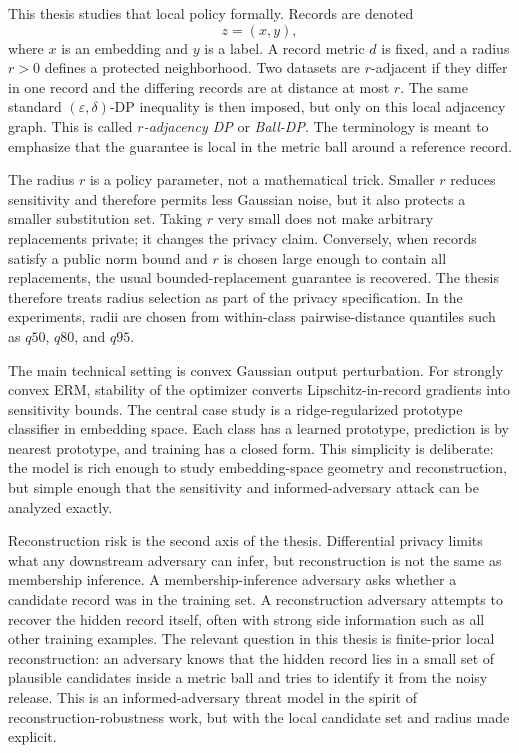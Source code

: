 \documentclass[11pt,a4paper]{report}
\theoremstyle{plain}
\theoremstyle{definition}
\theoremstyle{remark}
\begin{document}
This thesis studies that local policy formally.  Records are denoted
\[
 z=(x,y),
\]
where $x$ is an embedding and $y$ is a label.  A record metric $d$ is fixed, and a radius $r>0$ defines a protected neighborhood.  Two datasets are $r$-adjacent if they differ in one record and the differing records are at distance at most $r$.  The same standard $(\varepsilon,\delta)$-DP inequality is then imposed, but only on this local adjacency graph.  This is called \emph{$r$-adjacency DP} or \emph{Ball-DP}.  The terminology is meant to emphasize that the guarantee is local in the metric ball around a reference record.

The radius $r$ is a policy parameter, not a mathematical trick.  Smaller $r$ reduces sensitivity and therefore permits less Gaussian noise, but it also protects a smaller substitution set.  Taking $r$ very small does not make arbitrary replacements private; it changes the privacy claim.  Conversely, when records satisfy a public norm bound and $r$ is chosen large enough to contain all replacements, the usual bounded-replacement guarantee is recovered.  The thesis therefore treats radius selection as part of the privacy specification.  In the experiments, radii are chosen from within-class pairwise-distance quantiles such as $q50$, $q80$, and $q95$.

The main technical setting is convex Gaussian output perturbation.  For strongly convex ERM, stability of the optimizer converts Lipschitz-in-record gradients into sensitivity bounds.  The central case study is a ridge-regularized prototype classifier in embedding space.  Each class has a learned prototype, prediction is by nearest prototype, and training has a closed form.  This simplicity is deliberate: the model is rich enough to study embedding-space geometry and reconstruction, but simple enough that the sensitivity and informed-adversary attack can be analyzed exactly.

Reconstruction risk is the second axis of the thesis.  Differential privacy limits what any downstream adversary can infer, but reconstruction is not the same as membership inference.  A membership-inference adversary asks whether a candidate record was in the training set.  A reconstruction adversary attempts to recover the hidden record itself, often with strong side information such as all other training examples.  The relevant question in this thesis is finite-prior local reconstruction: an adversary knows that the hidden record lies in a small set of plausible candidates inside a metric ball and tries to identify it from the noisy release.  This is an informed-adversary threat model in the spirit of reconstruction-robustness work, but with the local candidate set and radius made explicit.
\end{document}
